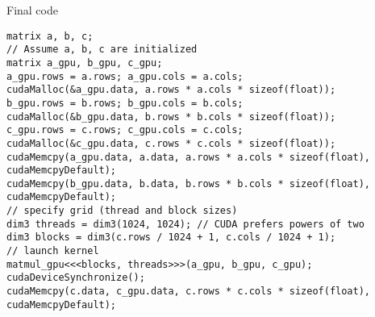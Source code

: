 \begin{frame}[fragile]{Final code}
    \begin{verbatim}
matrix a, b, c;
// Assume a, b, c are initialized
matrix a_gpu, b_gpu, c_gpu;
a_gpu.rows = a.rows; a_gpu.cols = a.cols;
cudaMalloc(&a_gpu.data, a.rows * a.cols * sizeof(float));
b_gpu.rows = b.rows; b_gpu.cols = b.cols;
cudaMalloc(&b_gpu.data, b.rows * b.cols * sizeof(float));
c_gpu.rows = c.rows; c_gpu.cols = c.cols;
cudaMalloc(&c_gpu.data, c.rows * c.cols * sizeof(float));
cudaMemcpy(a_gpu.data, a.data, a.rows * a.cols * sizeof(float), cudaMemcpyDefault);
cudaMemcpy(b_gpu.data, b.data, b.rows * b.cols * sizeof(float), cudaMemcpyDefault);
// specify grid (thread and block sizes)
dim3 threads = dim3(1024, 1024); // CUDA prefers powers of two
dim3 blocks = dim3(c.rows / 1024 + 1, c.cols / 1024 + 1);
// launch kernel
matmul_gpu<<<blocks, threads>>>(a_gpu, b_gpu, c_gpu);
cudaDeviceSynchronize();
cudaMemcpy(c.data, c_gpu.data, c.rows * c.cols * sizeof(float), cudaMemcpyDefault);
    \end{verbatim}
\end{frame}